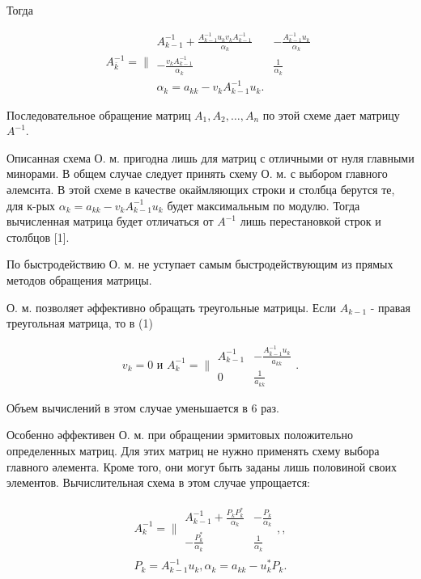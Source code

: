 \documentclass[10pt]{article}
\begin{document}
Тогда

\[
A_{\bar{k}}^{-1}=\| \begin{array}{cc}
A_{k-1}^{-1}+\frac{A_{k-1}^{-1} u_{k} v_{k} A_{k-1}^{-1}}{\alpha_{k}} & -\frac{A_{k-1}^{-1} u_{k}}{\alpha_{k}} \\
-\frac{v_{k} A_{k-1}^{-1}}{\alpha_{k}} & \frac{1}{\alpha_{k}} \\
\alpha_{k}=a_{k k}-v_{k} A_{k-1}^{-1} u_{k} .
\end{array}
\]

Последовательное обращение матриц $A_{1}, A_{2}, \ldots, A_{n}$ по этой схеме дает матрицу $A^{-1}$.

Описанная схема О. м. пригодна лишь для матриц с отличными от нуля главными минорами. В общем случае следует принять схему О. м. с выбором главного әлемснта. В этой схеме в качестве окаймляющих строки и столбца берутся те, для к-рых $\alpha_{k}=a_{k k}-v_{k} A_{k-1}^{-1} u_{k}$ будет максимальным по модулю. Тогда вычисленная матрица будет отличаться от $A^{-1}$ лишь перестановкой строк и столбцов [1].

По быстродействию О. м. не уступает самым быстродействующим из прямых методов обращения матрицы.

О. м. позволяет әффективно обращать треугольные матрицы. Если $A_{k-1}$ - правая треугольная матрица, то в (1)

\[
v_{k}=0 \text { и } A_{k}^{-1}=\| \begin{array}{cc}
A_{k-1}^{-1} & -\frac{A_{\bar{k}-1}^{-1} u_{k}}{a_{k k}} \\
0 & \frac{1}{a_{k k}}
\end{array} .
\]

Объем вычислений в этом случае уменьшается в 6 раз.

Особенно әффективен О. м. при обращении эрмитовых положительно определенных матриц. Для этих матриц не нужно применять схему выбора главного әлемента. Кроме того, они могут быть заданы лишь половиной своих элементов. Вычислительная схема в этом случае упрощается:

\[
\begin{gathered}
A_{k}^{-1}=\| \begin{array}{rr}
A_{k-1}^{-1}+\frac{P_{k} P_{k}^{*}}{\alpha_{k}} & -\frac{P_{k}}{\alpha_{k}} \\
-\frac{P_{k}^{*}}{\alpha_{k}} & \frac{1}{\alpha_{k}}
\end{array},, \\
P_{k}=A_{k-1}^{-1} u_{k}, \alpha_{k}=a_{k k}-u_{k}^{*} P_{k} .
\end{gathered}
\]
\end{document}
